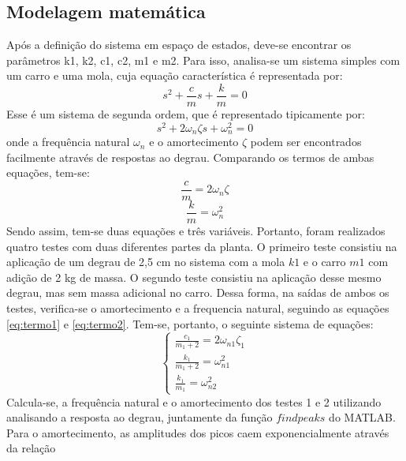 \documentclass{ifacconf}
\begin{document}
\subsection{Modelagem matemática}

Após a definição do sistema em espaço de estados, deve-se encontrar os parâmetros
k1, k2, c1, c2, m1 e m2. Para isso, analisa-se um sistema simples com um carro e uma mola,
cuja equação característica é representada por:
\begin{equation}
  s^2 + \frac{c}{m}s + \frac{k}{m} = 0
\end{equation}
Esse é um sistema de segunda ordem, que é representado tipicamente por:
\begin{equation}
  s^2 + 2\omega_n \zeta s + \omega_n^2 = 0
\end{equation}
onde a frequência natural $\omega_n$ e o amortecimento $\zeta$ podem ser
encontrados facilmente através de respostas ao degrau.
Comparando os termos de ambas equações, tem-se:
\begin{equation}
  \label{eq:termo1}
  \frac{c}{m} = 2\omega_n \zeta
\end{equation}
\begin{equation}
  \label{eq:termo2}
  \frac{k}{m} = \omega_n^2
\end{equation}
Sendo assim, tem-se duas equações e três variáveis. Portanto, foram realizados quatro testes com duas diferentes partes da planta.
O primeiro teste consistiu na aplicação de um degrau de 2,5 cm
no sistema com a mola $k1$ e o carro $m1$ com adição de 2 kg de massa. O segundo teste consistiu na
aplicação desse mesmo degrau, mas sem massa adicional no carro. Dessa forma, na saídas de ambos os testes,
verifica-se o amortecimento e a frequencia natural, seguindo as equações \ref{eq:termo1} e \ref{eq:termo2}.
Tem-se, portanto, o seguinte sistema de equações:
\begin{equation}
  \label{eq:sistema1}
  \left\{
\begin{array}{lr}
  \frac{c_1}{m_1 + 2} = 2\omega_{n1} \zeta_1 \\
  \frac{k_1}{m_1 + 2} = \omega_{n1}^2 \\
  \frac{k_1}{m_1} = \omega_{n2}^2
\end{array}
\right.
\end{equation}
Calcula-se, a frequência natural e o amortecimento dos testes 1 e 2 utilizando analisando a resposta ao degrau, juntamente
da função $findpeaks$ do MATLAB. Para o amortecimento, as amplitudes dos picos caem exponencialmente através da relação
\end{document}
